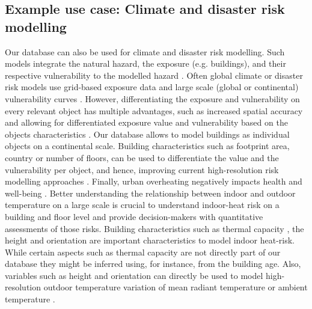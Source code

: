\documentclass[fleqn,10pt]{wlscirep}
\begin{document}
\subsection*{Example use case: Climate and disaster risk modelling} 
Our database can also be used for climate and disaster risk modelling. Such models integrate the natural hazard, the exposure (e.g. buildings), and their respective vulnerability to the modelled hazard \cite{aznar2019climada}. Often global climate or disaster risk models use grid-based exposure data \cite{eberenz2020asset} and large scale (global or continental) vulnerability curves \cite{eberenz2020regional}. However, differentiating the exposure and vulnerability on every relevant object has multiple advantages, such as increased spatial accuracy and allowing for differentiated exposure value and vulnerability based on the objects characteristics \cite{van2021flood}. Our database allows to model buildings as individual objects on a continental scale. Building characteristics such as footprint area, country or number of floors, can be used to differentiate the value and the vulnerability per object, and hence, improving current high-resolution risk modelling approaches \cite{stalhandske2022projected}. Finally, urban overheating negatively impacts health and well-being \cite{nazarian2022integrated}. Better understanding the relationship between indoor and outdoor temperature on a large scale is crucial to understand indoor-heat risk on a building and floor level and provide decision-makers with quantitative assessments of those risks. Building characteristics such as thermal capacity \cite{buchin2016role}, the height and orientation are important characteristics to model indoor heat-risk. While certain aspects such as thermal capacity are not directly part of our database they might be inferred using, for instance, from the building age. Also, variables such as height and orientation can directly be used to model high-resolution outdoor temperature variation of mean radiant temperature \cite{lindberg2008solweig} or ambient temperature \cite{zumwald2021mapping}.  
\end{document}
